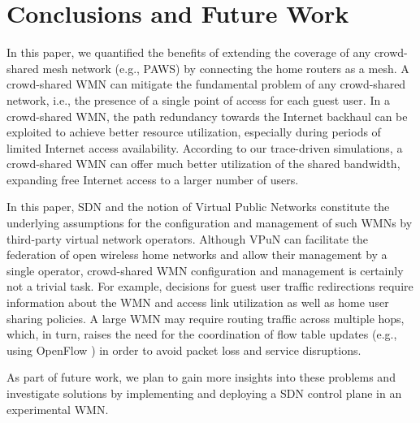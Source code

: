 \section{Conclusions and Future Work}
\label{sec:conclusion}

In this paper, we quantified the benefits of extending the coverage of any crowd-shared mesh network (e.g., PAWS) by connecting the home routers as a mesh. A crowd-shared WMN can mitigate the fundamental problem of any crowd-shared network, i.e., the presence of a single point of access for each guest user. In a crowd-shared WMN, the path redundancy towards the Internet backhaul can be exploited to achieve better resource utilization, especially during periods of limited Internet access availability. According to our trace-driven simulations, a crowd-shared WMN can offer much better utilization of the shared bandwidth,  expanding free Internet access to a larger number of users.

In this paper, SDN and the notion of Virtual Public Networks \cite{EWSDN} constitute the underlying assumptions for the configuration and management of such WMNs by third-party virtual network operators. Although VPuN can facilitate the federation of open wireless home networks and allow their management by a single operator, crowd-shared WMN configuration and management is certainly not a trivial task. For example, decisions for guest user traffic redirections require information about the WMN and access link utilization as well as home user sharing policies. A large WMN may require routing traffic across multiple hops, which, in turn, raises the need for the coordination of flow table updates (e.g., using OpenFlow \cite{OPENFLOW}) in order to avoid packet loss and service disruptions. 

As part of future work, we plan to gain more insights into these problems and investigate solutions by implementing and deploying a SDN control plane in an experimental WMN.  
